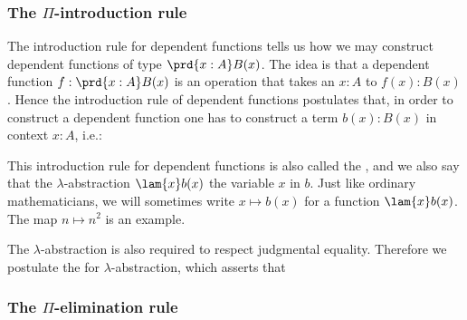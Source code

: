 \subsubsection{The $\Pi$-introduction rule}
The introduction rule for dependent functions tells us how we may construct dependent functions of type $\prd{x:A}B(x)$. The idea is that a dependent function $f:\prd{x:A}B(x)$ is an operation that takes an $x:A$ to $f(x):B(x)$. Hence the introduction rule of dependent functions postulates that, in order to construct a dependent function one has to construct a term $b(x):B(x)$ in context $x:A$, i.e.:
\begin{prooftree}
\end{prooftree}
This introduction rule%
for dependent functions is also called the %
%
%
, and we also say that the $\lambda$-abstraction $\lam{x}b(x)$  the variable $x$ in $b$. Just like ordinary mathematicians, we will sometimes write $x\mapsto b(x)$ for a function $\lam{x}b(x)$. The map $n\mapsto n^2$ is an example.

The $\lambda$-abstraction is also required to respect judgmental equality. Therefore we postulate the  for $\lambda$-abstraction,
which asserts that
\begin{prooftree}
\end{prooftree}

\subsubsection{The $\Pi$-elimination rule}

